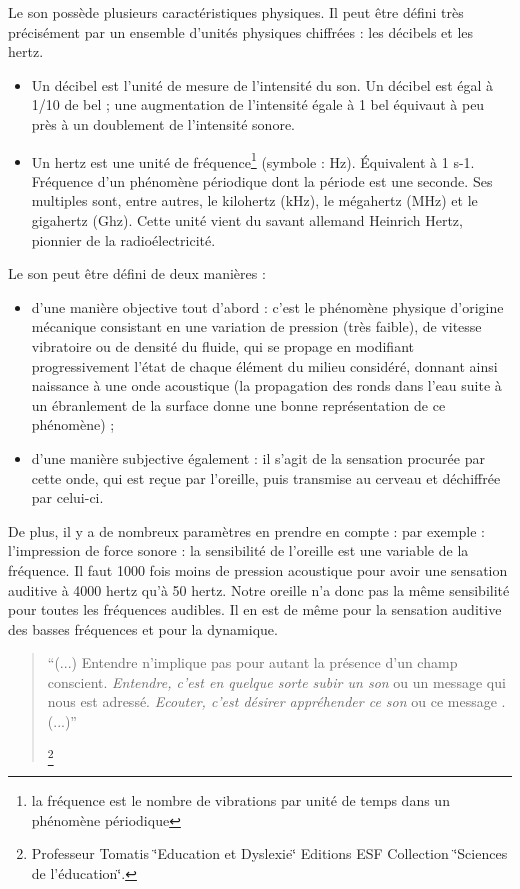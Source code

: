 Le son possède plusieurs caractéristiques physiques. Il peut être
défini très précisément par un ensemble d'unités physiques chiffrées
: les décibels et les hertz. 
\begin{itemize}
\item Un décibel est l'unité de mesure de l'intensité du son. Un décibel
est égal à 1/10 de bel ; une augmentation de l'intensité égale à 1
bel équivaut à peu près à un doublement de l'intensité sonore. 
\item Un hertz est une unité de fréquence\footnote{la fréquence est le nombre de vibrations par unité de temps dans un
phénomène périodique} (symbole : Hz). Équivalent à 1 s-1. Fréquence d'un phénomène périodique
dont la période est une seconde. Ses multiples sont, entre autres,
le kilohertz (kHz), le mégahertz (MHz) et le gigahertz (Ghz). Cette
unité vient du savant allemand Heinrich Hertz, pionnier de la radioélectricité.
\end{itemize}
Le son peut être défini de deux manières : 
\begin{itemize}
\item d'une manière objective tout d'abord : c'est le phénomène physique
d'origine mécanique consistant en une variation de pression (très
faible), de vitesse vibratoire ou de densité du fluide, qui se propage
en modifiant progressivement l'état de chaque élément du milieu considéré,
donnant ainsi naissance à une onde acoustique (la propagation des
ronds dans l'eau suite à un ébranlement de la surface donne une bonne
représentation de ce phénomène) ; 
\item d'une manière subjective également : il s'agit de la sensation procurée
par cette onde, qui est reçue par l'oreille, puis transmise au cerveau
et déchiffrée par celui-ci.
\end{itemize}
De plus, il y a de nombreux paramètres en prendre en compte : par
exemple : l'impression de force sonore : la sensibilité de l'oreille
est une variable de la fréquence. Il faut 1000 fois moins de pression
acoustique pour avoir une sensation auditive à 4000 hertz qu'à 50
hertz. Notre oreille n'a donc pas la même sensibilité pour toutes
les fréquences audibles. Il en est de même pour la sensation auditive
des basses fréquences et pour la dynamique. 

\begin{quote}
``(...) Entendre n'implique pas pour autant la présence d'un champ
conscient.\emph{ Entendre, c\textquoteright est en quelque sorte subir
un son }ou un message qui nous est adressé. \emph{Ecouter, c'est désirer
appréhender ce son }ou ce message . (...)'' 

\footnote{Professeur Tomatis \char`\"{}Education et Dyslexie\char`\"{} Editions
ESF Collection \char`\"{}Sciences de l'éducation\char`\"{}.}
\end{quote}
